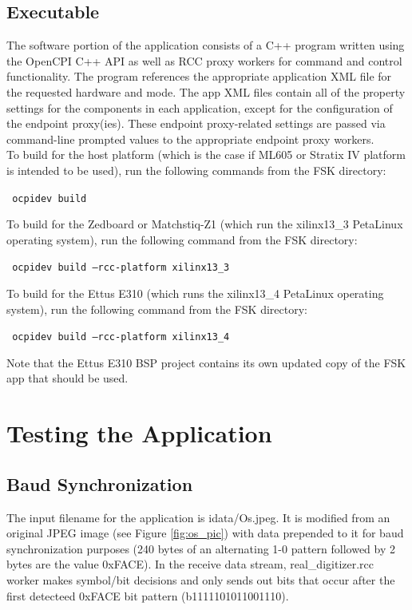 \subsection{Executable}
The software portion of the application consists of a C++ program written using the OpenCPI C++ API as well as RCC proxy workers for command and control functionality. The program references the appropriate application XML file for the requested hardware and mode. The app XML files contain all of the property settings for the components in each application, except for the configuration of the endpoint proxy(ies). These endpoint proxy-related settings are passed via command-line prompted values to the appropriate endpoint proxy workers.\\
To build for the host platform (which is the case if ML605 or Stratix IV platform is intended to be used), run the following commands from the FSK directory:\par\medskip
\texttt{ ocpidev build}\par\medskip
\noindent To build for the Zedboard or Matchstiq-Z1 (which run the xilinx13\_3 PetaLinux operating system), run the following command from the FSK directory:\par\medskip 
\texttt{ ocpidev build --rcc-platform xilinx13\_3 }\par\medskip
\noindent To build for the Ettus E310 (which runs the xilinx13\_4 PetaLinux operating system), run the following command from the FSK directory:\par\medskip 
\texttt{ ocpidev build --rcc-platform xilinx13\_4 }\par\medskip
Note that the Ettus E310 BSP project contains its own updated copy of the FSK app that should be used.

\section{Testing the Application}
\subsection{Baud Synchronization}
The input filename for the application is idata/Os.jpeg. It is modified from an original JPEG image (see Figure \ref{fig:os_pic}) with data prepended to it for baud synchronization purposes (240 bytes of an alternating 1-0 pattern followed by 2 bytes are the value 0xFACE). In the receive data stream, real\_digitizer.rcc worker makes symbol/bit decisions and only sends out bits that occur after the first detecteed 0xFACE bit pattern (b1111101011001110).
